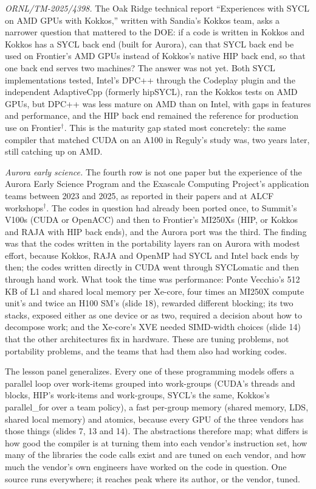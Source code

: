 \documentclass[11pt,letterpaper]{article}
\begin{document}
\emph{ORNL/TM-2025/4398.} The Oak Ridge technical report ``Experiences with SYCL on AMD GPUs with Kokkos,'' written with Sandia's Kokkos team, asks a narrower question that mattered to the DOE: if a code is written in Kokkos and Kokkos has a SYCL back end (built for Aurora), can that SYCL back end be used on Frontier's AMD GPUs instead of Kokkos's native HIP back end, so that one back end serves two machines? The answer was not yet. Both SYCL implementations tested, Intel's DPC++ through the Codeplay plugin and the independent AdaptiveCpp (formerly hipSYCL), ran the Kokkos tests on AMD GPUs, but DPC++ was less mature on AMD than on Intel, with gaps in features and performance, and the HIP back end remained the reference for production use on Frontier$^\dagger$. This is the maturity gap stated most concretely: the same compiler that matched CUDA on an A100 in Reguly's study was, two years later, still catching up on AMD.

\emph{Aurora early science.} The fourth row is not one paper but the experience of the Aurora Early Science Program and the Exascale Computing Project's application teams between 2023 and 2025, as reported in their papers and at ALCF workshops$^\dagger$. The codes in question had already been ported once, to Summit's V100s (CUDA or OpenACC) and then to Frontier's MI250Xs (HIP, or Kokkos and RAJA with HIP back ends), and the Aurora port was the third. The finding was that the codes written in the portability layers ran on Aurora with modest effort, because Kokkos, RAJA and OpenMP had SYCL and Intel back ends by then; the codes written directly in CUDA went through SYCLomatic and then through hand work. What took the time was performance: Ponte Vecchio's 512 KB of L1 and shared local memory per Xe-core, four times an MI250X compute unit's and twice an H100 SM's (slide 18), rewarded different blocking; its two stacks, exposed either as one device or as two, required a decision about how to decompose work; and the Xe-core's XVE needed SIMD-width choices (slide 14) that the other architectures fix in hardware. These are tuning problems, not portability problems, and the teams that had them also had working codes.

The lesson panel generalizes. Every one of these programming models offers a parallel loop over work-items grouped into work-groups (CUDA's threads and blocks, HIP's work-items and work-groups, SYCL's the same, Kokkos's parallel\_for over a team policy), a fast per-group memory (shared memory, LDS, shared local memory) and atomics, because every GPU of the three vendors has those things (slides 7, 13 and 14). The abstractions therefore map; what differs is how good the compiler is at turning them into each vendor's instruction set, how many of the libraries the code calls exist and are tuned on each vendor, and how much the vendor's own engineers have worked on the code in question. One source runs everywhere; it reaches peak where its author, or the vendor, tuned.
\end{document}
